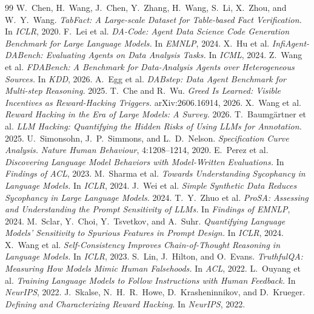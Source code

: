 \documentclass[10pt]{article}
\begin{document}

\begin{thebibliography}{99}
 W.~Chen, H.~Wang, J.~Chen, Y.~Zhang,
  H.~Wang, S.~Li, X.~Zhou, and W.~Y.~Wang. \emph{TabFact: A Large-scale Dataset for
  Table-based Fact Verification.} In \emph{ICLR}, 2020.
 F.~Lei et al. \emph{DA-Code: Agent Data
  Science Code Generation Benchmark for Large Language Models.} In \emph{EMNLP}, 2024.
 X.~Hu et al. \emph{InfiAgent-DABench:
  Evaluating Agents on Data Analysis Tasks.} In \emph{ICML}, 2024.
 Z.~Wang et al. \emph{FDABench: A
  Benchmark for Data-Analysis Agents over Heterogeneous Sources.} In \emph{KDD}, 2026.
 A.~Egg et al. \emph{DABstep: Data Agent
  Benchmark for Multi-step Reasoning.} 2025.
 T.~Che and R.~Wu. \emph{Greed Is Learned:
  Visible Incentives as Reward-Hacking Triggers.} arXiv:2606.16914, 2026.
 X.~Wang et al. \emph{Reward
  Hacking in the Era of Large Models: A Survey.} 2026.
 T.~Baumg\"artner et al.
  \emph{LLM Hacking: Quantifying the Hidden Risks of Using LLMs for Annotation.} 2025.
 U.~Simonsohn, J.~P.~Simmons, and
  L.~D.~Nelson. \emph{Specification Curve Analysis.} \emph{Nature Human Behaviour},
  4:1208--1214, 2020.
 E.~Perez et al. \emph{Discovering
  Language Model Behaviors with Model-Written Evaluations.} In \emph{Findings of ACL},
  2023.
 M.~Sharma et al. \emph{Towards
  Understanding Sycophancy in Language Models.} In \emph{ICLR}, 2024.
 J.~Wei et al. \emph{Simple Synthetic
  Data Reduces Sycophancy in Large Language Models.} 2024.
 T.~Y.~Zhuo et al.
  \emph{ProSA: Assessing and Understanding the Prompt Sensitivity of LLMs.} In
  \emph{Findings of EMNLP}, 2024.
 M.~Sclar, Y.~Choi, Y.~Tsvetkov,
  and A.~Suhr. \emph{Quantifying Language Models' Sensitivity to Spurious Features in
  Prompt Design.} In \emph{ICLR}, 2024.
 X.~Wang et al.
  \emph{Self-Consistency Improves Chain-of-Thought Reasoning in Language Models.} In
  \emph{ICLR}, 2023.
 S.~Lin, J.~Hilton, and O.~Evans.
  \emph{TruthfulQA: Measuring How Models Mimic Human Falsehoods.} In \emph{ACL}, 2022.
 L.~Ouyang et al. \emph{Training
  Language Models to Follow Instructions with Human Feedback.} In \emph{NeurIPS}, 2022.
 J.~Skalse, N.~H.~R.~Howe, D.~Krasheninnikov,
  and D.~Krueger. \emph{Defining and Characterizing Reward Hacking.} In \emph{NeurIPS},
  2022.
\end{thebibliography}
\end{document}
